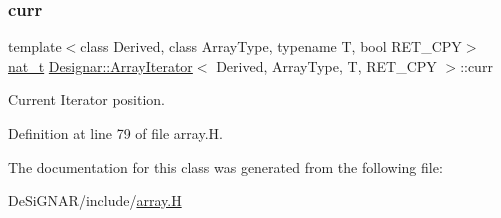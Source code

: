 \subsubsection{\texorpdfstring{curr}{curr}}
{\footnotesize\ttfamily template$<$class Derived, class Array\+Type, typename T, bool R\+E\+T\+\_\+\+C\+PY$>$ \\
\hyperlink{namespace_designar_aa72662848b9f4815e7bf31a7cf3e33d1}{nat\+\_\+t} \hyperlink{class_designar_1_1_array_iterator}{Designar\+::\+Array\+Iterator}$<$ Derived, Array\+Type, T, R\+E\+T\+\_\+\+C\+PY $>$\+::curr\hspace{0.3cm}{\ttfamily [protected]}}



Current Iterator position. 



Definition at line 79 of file array.\+H.



The documentation for this class was generated from the following file\+:\begin{DoxyCompactItemize}
\item 
De\+Si\+G\+N\+A\+R/include/\hyperlink{array_8_h}{array.\+H}\end{DoxyCompactItemize}
